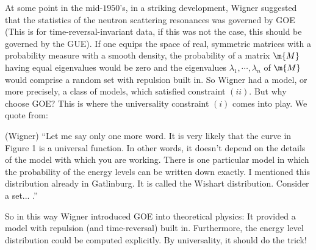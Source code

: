 At some point in the mid-$1950$’s, in a striking development, Wigner suggested that the statistics of the neutron scattering resonances was governed by GOE (This is for time-reversal-invariant data, if this was not the case, this should be governed by the GUE). If one equips the space of real, symmetric matrices with a probability measure with a smooth density, the probability of a matrix $\m{M}$ having equal eigenvalues would be zero and the eigenvalues $\lambda_1, \cdots , \lambda_n$ of $\m{M}$ would comprise a random set with repulsion built in. So Wigner had a model, or more precisely, a class of models, which satisfied constraint $(ii)$. But why choose GOE? This is where the universality constraint $(i)$ comes into play. We quote from:
\begin{citation}
	(Wigner)
	“Let me say only one more word. It is very likely that the curve in Figure 1 is a universal function. In other words, it doesn’t depend on the details of the model with which you are working. There is one particular model in which the probability of the energy levels can be written down exactly. I mentioned this distribution already in Gatlinburg. It is called the Wishart distribution. Consider a set... .” 
\end{citation}
So in this way Wigner introduced GOE into theoretical physics: It provided a model with repulsion (and time-reversal) built in. Furthermore, the energy level distribution could be computed explicitly. By universality, it should do the trick! 